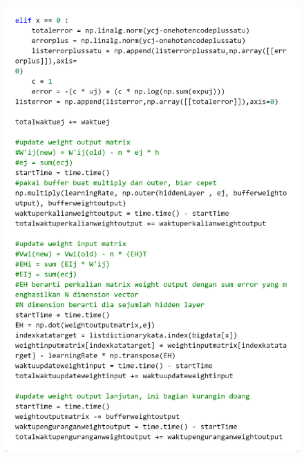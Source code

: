 \documentclass[12pt]{report}
\begin{document}
\begin{figure}[H]
\centering
\includegraphics[scale=0.3]{training5}
\end{figure}
\end{document}
